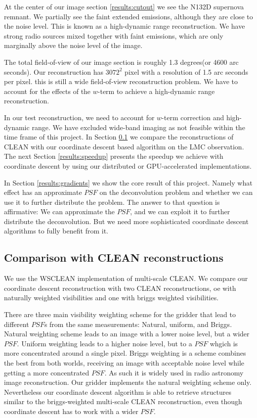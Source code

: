 At the center of our image section \ref{results:cutout} we see the N132D supernova remnant. We partially see the faint extended emissions, although they are close to the noise level. This is known as a high-dynamic range reconstruction. We have strong radio sources mixed together with faint emissions, which are only marginally above the noise level of the image.

The total field-of-view of our image section is roughly 1.3 degrees(or 4600 arc seconds). Our reconstruction has $3072^2$ pixel with a resolution of 1.5 arc seconds per pixel. this is still a wide field-of-view reconstruction problem. We have to account for the effects of the $w$-term to achieve a high-dynamic range reconstruction.

In our test reconstruction, we need to account for $w$-term correction and high-dynamic range. We have excluded wide-band imaging as not feasible within the time frame of this project. In Section \ref{results:cleancomp} we compare the reconstructions of CLEAN with our coordinate descent based algorithm on the LMC observation. The next Section \ref{results:speedup} presents the speedup we achieve with coordinate descent by using our distributed or GPU-accelerated implementations.

In Section \ref{results:gradients} we show the core result of this project. Namely what effect has an approximate $PSF$ on the deconvolution problem and whether we can use it to further distribute the problem. The answer to that question is affirmative: We can approximate the $PSF$, and we can exploit it to further distribute the deconvolution. But we need more sophisticated coordinate descent algorithms to fully benefit from it.


\subsection{Comparison with CLEAN reconstructions} \label{results:cleancomp}
We use the WSCLEAN \cite{offringa2014wsclean} implementation of multi-scale CLEAN. We compare our coordinate descent reconstruction with two CLEAN reconstructions, oe with naturally weighted visibilities and one with briggs weighted visibilities.

There are three main visibility weighting scheme for the gridder that lead to different $PSF$s from the same measurements: Natural, uniform, and Briggs\cite{briggsWeighting}. Natural weighting scheme leads to an image with a lower noise level, but a wider $PSF$. Uniform weighting leads to a higher noise level, but to a $PSF$ whgich is more concentrated around a single pixel. Briggs weighting is a scheme combines the best from both worlds, receiving an image with acceptable noise level while getting a more concentrated $PSF$. As such it is widely used in radio astronomy image reconstruction. Our gridder implements the natural weighting scheme only. Nevertheless our coordinate descent algorithm is able to retrieve structures similar to the briggs-weighted multi-scale CLEAN reconstruction, even though coordinate descent has to work with a wider $PSF$.

